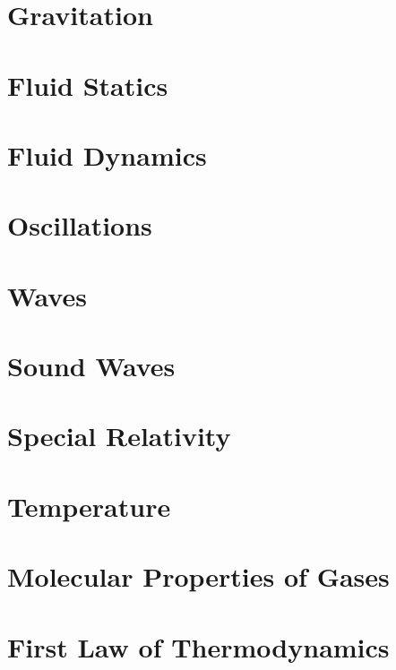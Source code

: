 \documentclass{article}
\begin{document}
\section{Gravitation}


\section{Fluid Statics}


\section{Fluid Dynamics}


\section{Oscillations}


\section{Waves}


\section{Sound Waves}


\section{Special Relativity}


\section{Temperature}


\section{Molecular Properties of Gases}


\section{First Law of Thermodynamics}

\end{document}

